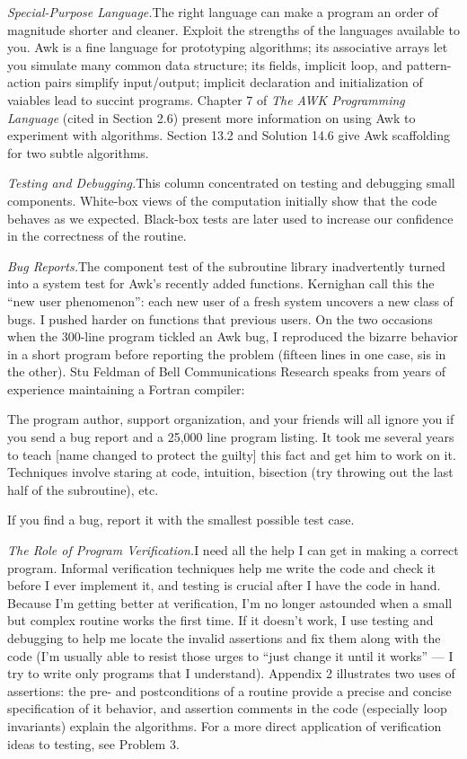 {\it Special-Purpose Language.}\quad The right language can make a program an
order of magnitude shorter and cleaner. Exploit the strengths of the languages
available to you. Awk is a fine language for prototyping algorithms; its
associative arrays let you simulate many common data structure; its fields,
implicit loop, and pattern-action pairs simplify input/output; implicit
declaration and initialization of vaiables lead to succint programs. Chapter 7
of {\sl The AWK Programming Language\/} (cited in Section 2.6) present more
information on using Awk to experiment with algorithms. Section 13.2 and
Solution 14.6 give Awk scaffolding for two subtle algorithms.

{\it Testing and Debugging.}\quad This column concentrated on testing and
debugging small components. White-box views of the computation initially show
that the code behaves as we expected. Black-box tests are later used to
increase our confidence in the correctness of the routine.

{\it Bug Reports.}\quad The component test of the subroutine library
inadvertently turned into a system test for Awk's recently added functions.
Kernighan call this the ``new user phenomenon'': each new user of a fresh
system uncovers a new class of bugs. I pushed harder on functions that previous
users. On the two occasions when the 300-line program tickled an Awk bug, I
reproduced the bizarre behavior in a short program before reporting the problem
(fifteen lines in one case, sis in the other). Stu Feldman of Bell
Communications Research speaks from years of experience maintaining a Fortran
compiler:

{\narrower
The program author, support organization, and your friends will all ignore you
if you send a bug report and a 25{,}000 line program listing. It took me several
years to teach [name changed to protect the guilty] this fact and get him to
work on it. Techniques involve staring at code, intuition, bisection (try
throwing out the last half of the subroutine), etc.\par}

\noindent If you find a bug, report it with the smallest possible test case.

{\it The Role of Program Verification.}\quad I need all the help I can get in
making a correct program. Informal verification techniques help me write the
code and check it before I ever implement it, and testing is crucial after I
have the code in hand. Because I'm getting better at verification, I'm no longer
astounded when a small but complex routine works the first time. If it doesn't
work, I use testing and debugging to help me locate the invalid assertions and
fix them along with the code (I'm usually able to resist those urges to ``just
change it until it works'' --- I try to write only programs that I understand).
Appendix 2 illustrates two uses of assertions: the pre- and postconditions of a
routine provide a precise and concise specification of it behavior, and
assertion comments in the code (especially loop invariants) explain the
algorithms. For a more direct application of verification ideas to testing, see
Problem 3.

